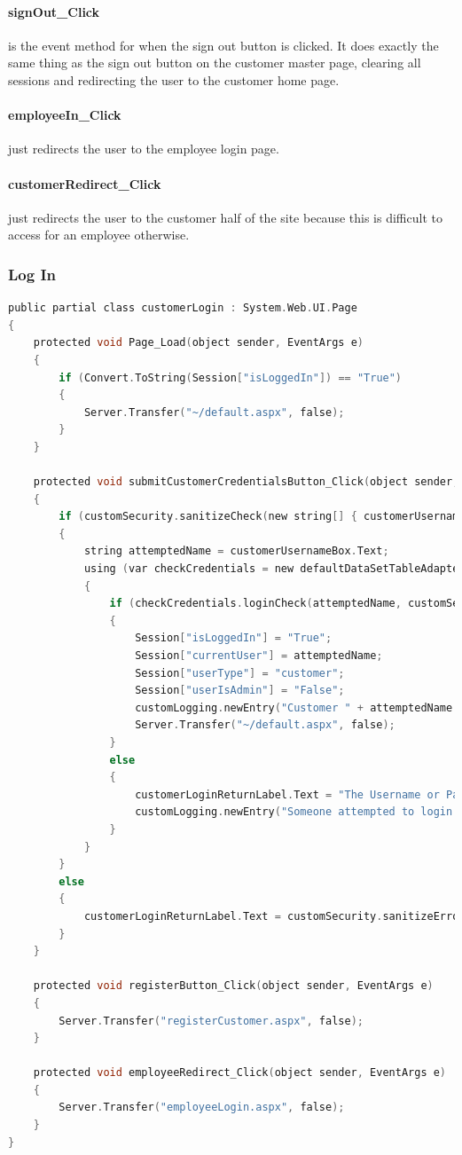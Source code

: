 ﻿\documentclass{article}
\begin{document}
    \paragraph{signOut\_Click} is the event method for when the sign out button is clicked.
    It does exactly the same thing as the sign out button on the customer master page, clearing all sessions and redirecting the user to the customer home page.
    \paragraph{employeeIn\_Click} just redirects the user to the employee login page.
    \paragraph{customerRedirect\_Click} just redirects the user to the customer half of the site because this is difficult to access for an employee otherwise.
    \newpage
    \subsubsection{Log In}
    \begin{lstlisting}[language=C]
public partial class customerLogin : System.Web.UI.Page
{
    protected void Page_Load(object sender, EventArgs e)
    {
        if (Convert.ToString(Session["isLoggedIn"]) == "True")
        {
            Server.Transfer("~/default.aspx", false);
        }
    }

    protected void submitCustomerCredentialsButton_Click(object sender, EventArgs e)
    {
        if (customSecurity.sanitizeCheck(new string[] { customerUsernameBox.Text, customerPasswordBox.Text }))
        {
            string attemptedName = customerUsernameBox.Text;
            using (var checkCredentials = new defaultDataSetTableAdapters.customersTableAdapter())
            {
                if (checkCredentials.loginCheck(attemptedName, customSecurity.generateMD5(customerPasswordBox.Text)) != null)
                {
                    Session["isLoggedIn"] = "True";
                    Session["currentUser"] = attemptedName;
                    Session["userType"] = "customer";
                    Session["userIsAdmin"] = "False";
                    customLogging.newEntry("Customer " + attemptedName + " logged in");
                    Server.Transfer("~/default.aspx", false);
                }
                else
                {
                    customerLoginReturnLabel.Text = "The Username or Password is incorrect.";
                    customLogging.newEntry("Someone attempted to login as a customer with username '" + attemptedName + "' but the credentials were incorrect");
                }
            }
        }
        else
        {
            customerLoginReturnLabel.Text = customSecurity.sanitizeErrorMessage;
        }
    }

    protected void registerButton_Click(object sender, EventArgs e)
    {
        Server.Transfer("registerCustomer.aspx", false);
    }

    protected void employeeRedirect_Click(object sender, EventArgs e)
    {
        Server.Transfer("employeeLogin.aspx", false);
    }
}
    \end{lstlisting}
\end{document}
